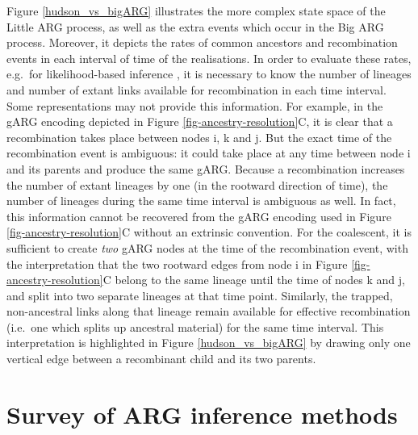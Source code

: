 \documentclass{article}
\newcommand{\noderef}[1]{\textsf{#1}}
\begin{document}
Figure \ref{hudson_vs_bigARG} illustrates the more complex state space
of the Little ARG process, as well as the extra events which occur in the Big ARG process.
Moreover, it depicts the rates of common ancestors and recombination events in each
interval of time of the realisations.
In order to evaluate these rates, e.g.\ for likelihood-based inference
\citep{baumdicker2021efficient, mahmoudi2022bayesian},
it is necessary to know the number of lineages and number of extant links
available for recombination in each time interval.
Some representations may not provide this information.
For example, in the gARG encoding depicted in Figure \ref{fig-ancestry-resolution}C,
it is clear that a recombination takes place between nodes \noderef{i}, \noderef{k} and \noderef{j}.
But the exact time of the recombination event is ambiguous: it could take place at any time between node \noderef{i} and its parents and produce the same gARG.
Because a recombination increases the number of extant lineages by one (in the rootward direction of time), the number of lineages during the same time interval is ambiguous as well.
In fact, this information cannot be recovered from the gARG encoding used in Figure \ref{fig-ancestry-resolution}C without an extrinsic convention.
For the coalescent,
it is sufficient to create \emph{two} gARG nodes at the time of the recombination event, with the interpretation that the two rootward edges from node \noderef{i} in Figure \ref{fig-ancestry-resolution}C belong to the same lineage until the time of nodes \noderef{k} and \noderef{j}, and split into two separate lineages at that time point.
Similarly, the trapped, non-ancestral links along that lineage remain available for effective recombination (i.e.\ one which splits up ancestral material) for the same time interval.
This interpretation is highlighted in
Figure \ref{hudson_vs_bigARG} by drawing only one vertical edge between a recombinant child and its two parents.



\section{Survey of ARG inference methods}
\label{sec-survey-arg-infer}
\end{document}
